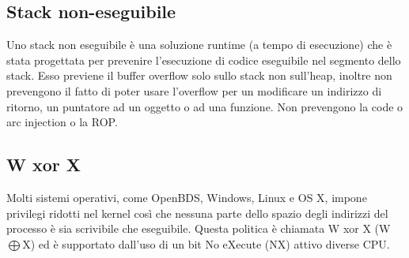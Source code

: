\subsection{Stack non-eseguibile}
Uno stack non eseguibile è una soluzione runtime (a tempo di esecuzione) che è stata progettata per prevenire l'esecuzione di codice eseguibile  nel segmento dello stack. Esso previene il buffer overflow solo sullo stack non sull'heap, inoltre non prevengono il fatto di poter usare l'overflow per un modificare un indirizzo di ritorno, un puntatore ad un oggetto o ad una funzione. Non prevengono la code o arc injection o la ROP.

\subsection{W xor X}
Molti sistemi operativi, come OpenBDS, Windows, Linux e OS X, impone privilegi ridotti nel kernel così
che nessuna parte dello spazio degli indirizzi del processo è sia scrivibile che eseguibile.
Questa politica è chiamata W xor X (W$\bigoplus$X) ed è supportato dall'uso di un bit No eXecute (NX) attivo diverse CPU.